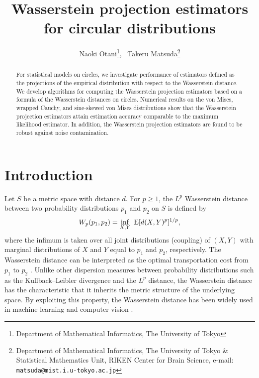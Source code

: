 \documentclass[11pt, a4paper]{article}
\begin{document}
\title{Wasserstein projection estimators for circular distributions}
	
	\author{Naoki Otani\thanks{Department of Mathematical Informatics, The University of Tokyo}, \ 
		Takeru Matsuda\thanks{Department of Mathematical Informatics, The University of Tokyo \& Statistical Mathematics Unit, RIKEN Center for Brain Science, e-mail: \texttt{matsuda@mist.i.u-tokyo.ac.jp}}}
	
	\date{}
	
	\maketitle
	
	\begin{abstract}
	For statistical models on circles, we investigate performance of estimators defined as the projections of the empirical distribution with respect to the Wasserstein distance.
We develop algorithms for computing the Wasserstein projection estimators based on a formula of the Wasserstein distances on circles.
Numerical results on the von Mises, wrapped Cauchy, and sine-skewed von Mises distributions show that the Wasserstein projection estimators attain estimation accuracy comparable to the maximum likelihood estimator.
In addition, the Wasserstein projection estimators are found to be robust against noise contamination.
	\end{abstract}

	\section{Introduction}
Let $S$ be a metric space with distance $d$.
For $p \geq 1$, the $L^p$ Wasserstein distance between two probability distributions $p_1$ and $p_2$ on $S$ is defined by
\[
W_p (p_1,p_2) = \inf_{X,Y} \ {\rm E} [ d(X,Y)^p ] ^{1/p},
\]
where the infimum is taken over all joint distributions (coupling) of $(X,Y)$ with marginal distributions of $X$ and $Y$ equal to $p_1$ and $p_2$, respectively.
The Wasserstein distance can be interpreted as the optimal transportation cost from $p_1$ to $p_2$ \cite{Villani2009}.
Unlike other dispersion measures between probability distributions such as the Kullback--Leibler divergence and the $L^p$ distance, the Wasserstein distance has the characteristic that it inherits the metric structure of the underlying space.
By exploiting this property, the Wasserstein distance has been widely used in machine learning and computer vision \citep{PC2019}.
\end{document}
